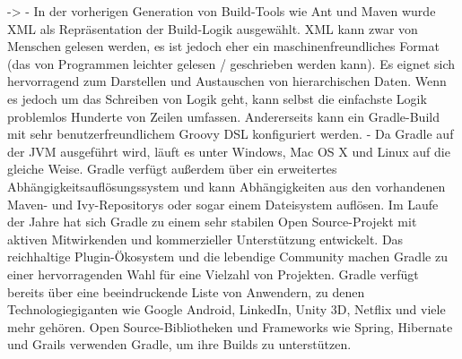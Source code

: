 		->
		- In der vorherigen Generation von Build-Tools wie Ant und Maven wurde XML als Repräsentation der Build-Logik ausgewählt. XML kann zwar von Menschen gelesen werden, es ist jedoch eher ein maschinenfreundliches Format (das von Programmen leichter gelesen / geschrieben werden kann). Es eignet sich hervorragend zum Darstellen und Austauschen von hierarchischen Daten. Wenn es jedoch um das Schreiben von Logik geht, kann selbst die einfachste Logik problemlos Hunderte von Zeilen umfassen. Andererseits kann ein Gradle-Build mit sehr benutzerfreundlichem Groovy DSL konfiguriert werden.
		- Da Gradle auf der JVM ausgeführt wird, läuft es unter Windows, Mac OS X und Linux auf die gleiche Weise. Gradle verfügt außerdem über ein erweitertes Abhängigkeitsauflösungssystem und kann Abhängigkeiten aus den vorhandenen Maven- und Ivy-Repositorys oder sogar einem Dateisystem auflösen. Im Laufe der Jahre hat sich Gradle zu einem sehr stabilen Open Source-Projekt mit aktiven Mitwirkenden und kommerzieller Unterstützung entwickelt. Das reichhaltige Plugin-Ökosystem und die lebendige Community machen Gradle zu einer hervorragenden Wahl für eine Vielzahl von Projekten. Gradle verfügt bereits über eine beeindruckende Liste von Anwendern, zu denen Technologiegiganten wie Google Android, LinkedIn, Unity 3D, Netflix und viele mehr gehören. Open Source-Bibliotheken und Frameworks wie Spring, Hibernate und Grails verwenden Gradle, um ihre Builds zu unterstützen.

